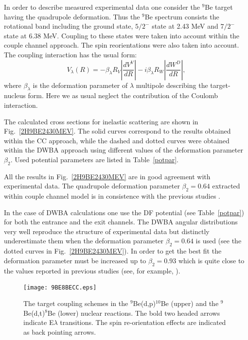 \documentclass[10pt]{iopart}
\begin{document}
In order to describe measured experimental data one consider the ${}^9$Be target having the quadrupole deformation. Thus the ${}^9$Be spectrum consists the rotational band including the ground state, $5/2^-$ state at 2.43 MeV and $7/2^-$ state at 6.38 MeV. Coupling to these states were taken into account within the couple channel approach. The spin reorientations were also taken into account. The coupling interaction has the usual form:
\begin{equation}
V_\lambda(R)=-\beta_\lambda R_V \left|\frac{d V^V}{dR}\right| - i \beta_\lambda R_W \left|\frac{d W^D}{dR}\right|,
\end{equation}
where $\beta_\lambda$ is the deformation parameter of $\lambda$ multipole describing the target-nucleus form. Here we as usual neglect the contribution of the Coulomb interaction.

The calculated cross sections for inelastic scattering are shown in Fig.~\ref{2H9BE2430MEV}. The solid curves correspond to the results obtained within the CC approach, while the dashed and dotted curves were obtained within the DWBA approach using  different values of the deformation parameter $\beta_2$. Used potential parameters are listed in Table~\ref{potpar}.

All the results in Fig.~\ref{2H9BE2430MEV} are in good agreement with experimental data. The quadrupole deformation parameter $\beta_2 = 0.64$ extracted within couple channel model is in consistence with the previous studies \cite{lukyanov2014, harakeh1980}.

In the case of DWBA calculations one use the DF potential (see Table~\ref{potpar}) for both the entrance and the exit channels. The DWBA angular distributions very well reproduce the structure of experimental data but distinctly underestimate them when the deformation parameter $\beta_2 = 0.64$ is used (see the dotted curves in Fig.~\ref{2H9BE2430MEV}). In order to get the best fit the deformation parameter must be increased up to $\beta_2 = 0.93$ which is quite close to the values reported in previous studies (see, for example, \cite{bodek1989, votava1973}).

\begin{figure}[bp]
\centering
\texttt{[image: 9BE8BECC.eps]}
\caption{ \label{9BE8BECC} The target coupling schemes in the ${}^9$Be(d,p)$^{10}$Be (upper) and the ${}^9$Be(d,t)$^8$Be (lower) nuclear reactions. The bold two headed arrows indicate E$\lambda$ transitions. The spin re-orientation effects are indicated as back pointing arrows.}
\end{figure}	
\end{document}
